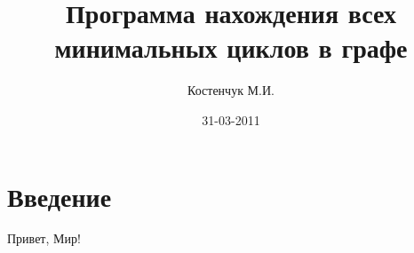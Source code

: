 \documentclass[a4paper,12pt]{article}
\title{Программа нахождения всех минимальных циклов в графе}
\author{Костенчук М.И.}
\date{31-03-2011}
\begin{document}


\tableofcontents
\newpage

\section{Введение}

Привет, Мир!
\end{document}
